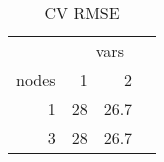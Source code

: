 \begin{table}

\caption{\label{tab:unnamed-chunk-2}CV RMSE}
\centering
\begin{tabular}[t]{r|r|r}
\hline
\multicolumn{1}{c|}{ } & \multicolumn{3}{c}{vars} \\
\cline{2-4}
nodes & 1 & 2\\
\hline
1 & 28 & 26.7\\
\hline
3 & 28 & 26.7\\
\hline
\end{tabular}
\end{table}